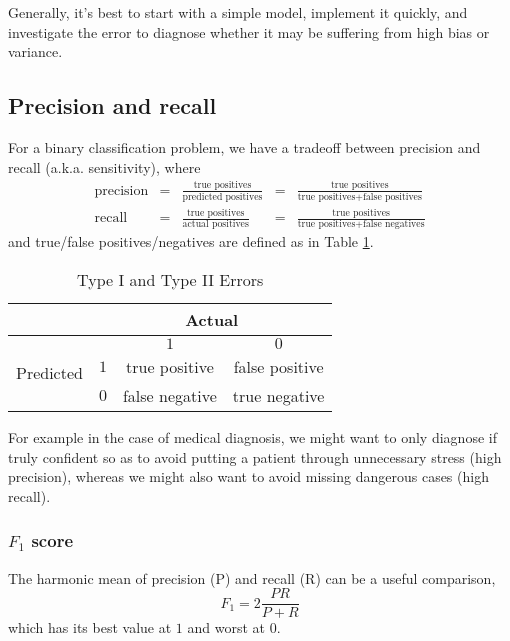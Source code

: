 \documentclass[a4paper,12pt]{article}
\theoremstyle{definition}
\begin{document}
Generally, it's best to start with a simple model, implement it quickly, and investigate the error to diagnose whether it may be suffering from high bias or variance.

\subsection{Precision and recall}
For a binary classification problem, we have a tradeoff between precision and recall (a.k.a. sensitivity), where
\[
\begin{array}{rcccl}
\text{precision} &=& \frac{\text{true positives}}{\text{predicted positives}} &=& \frac{\text{true positives}}{\text{true positives} + \text{false positives}} \\
\text{recall} &=& \frac{\text{true positives}}{\text{actual positives}} &=& \frac{\text{true positives}}{\text{true positives} + \text{false negatives}} 
\end{array} 
\]
and true/false positives/negatives are defined as in Table \ref{type-I-II-errors}.

\begin{table}[]
\centering
\caption{Type I and Type II Errors}
\label{type-I-II-errors}
\begin{tabular}{|c|c|c|c|}
\hline
                           & \multicolumn{3}{c|}{Actual}           \\ \hline
\multirow{3}{*}{Predicted} &     & $1$            & $0$            \\ \cline{2-4} 
                           & $1$ & true positive  & false positive \\ \cline{2-4} 
                           & $0$ & false negative & true negative  \\ \hline
\end{tabular}
\end{table}

For example in the case of medical diagnosis, we might want to only diagnose if truly confident so as to avoid putting a patient through unnecessary stress (high precision), whereas we might also want to avoid missing dangerous cases (high recall).

\subsubsection{$F_1$ score}
The harmonic mean of precision (P) and recall (R) can be a useful comparison,
\[ F_1 = 2 \frac{PR}{P + R} \]
which has its best value at $1$ and worst at $0$.
\end{document}

